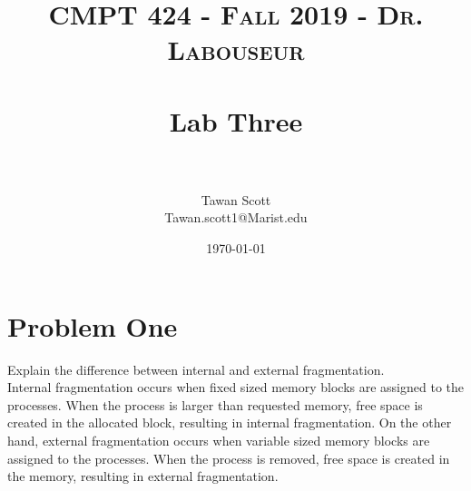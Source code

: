\documentclass[letterpaper, 10pt,DIV=13]{scrartcl}
\title{	
   \normalfont \normalsize 
   \textsc{CMPT 424 - Fall 2019 - Dr. Labouseur} \\[10pt] %
   \horrule{0.5pt} \\[0.25cm] 	%
   \huge Lab Three  \\     	    %
   \horrule{0.5pt} \\[0.25cm] 	%
}
\author{Tawan Scott \\ \normalsize Tawan.scott1@Marist.edu}
\date{\normalsize\today} 	%
\numberwithin{equation}{section} %
\numberwithin{figure}{section} %
\numberwithin{table}{section} %
\begin{document}
\maketitle %

\section{Problem One}
Explain	the	difference	between	internal	and	external	fragmentation.	
\\[12pt]
Internal fragmentation occurs when fixed sized memory blocks are assigned to the processes. When the process is larger than requested memory, free space is created in the allocated block, resulting in internal fragmentation. On the other hand, external fragmentation occurs when variable sized memory blocks are assigned to the processes. When the process is removed, free space is created in the memory, resulting in external fragmentation.


\end{document}
